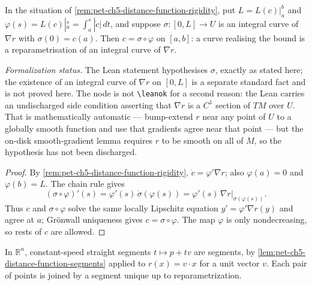 \begin{remark}
  \label{rem:pet-ch5-minimizer-is-reparametrized-integral-curve}
  In the situation of \cref{rem:pet-ch5-distance-function-rigidity}, put
  $L=L(c)|_a^b$ and $\varphi(s)=L(c)|_a^s=\int_a^s|\dot c|\,dt$, and suppose
  $\sigma:[0,L]\to U$ is an integral curve of $\nabla r$ with $\sigma(0)=c(a)$.
  Then $c=\sigma\circ\varphi$ on $[a,b]$: a curve realising the bound is a
  reparametrisation of an integral curve of $\nabla r$.

  \emph{Formalization status.} The Lean statement hypothesises $\sigma$, exactly
  as stated here; the existence of an integral curve of $\nabla r$ on $[0,L]$ is a
  separate standard fact and is not proved here. The node is not
  \texttt{\textbackslash leanok} for a second reason: the Lean carries an
  undischarged side condition asserting that $\nabla r$ is a $C^1$ section of $TM$
  over $U$. That is mathematically automatic — bump-extend $r$ near any point of
  $U$ to a globally smooth function and use that gradients agree near that point —
  but the on-disk smooth-gradient lemma requires $r$ to be smooth on all of $M$,
  so the hypothesis has not been discharged.
\end{remark}
\begin{proof}
  \sketch
  By \cref{rem:pet-ch5-distance-function-rigidity}, $\dot c=\varphi'\nabla r$;
  also $\varphi(a)=0$ and $\varphi(b)=L$.  The chain rule gives
  \[
    (\sigma\circ\varphi)'(s)=\varphi'(s)\,\dot\sigma(\varphi(s))
      =\varphi'(s)\,\nabla r|_{\sigma(\varphi(s))}.
  \]
  Thus $c$ and $\sigma\circ\varphi$ solve the same locally Lipschitz equation
  $y'=\varphi'\nabla r(y)$ and agree at $a$; Grönwall uniqueness gives
  $c=\sigma\circ\varphi$.  The map $\varphi$ is only nondecreasing, so rests of
  $c$ are allowed.
\end{proof}

\begin{example}
  \label{ex:pet-ch5-euclidean-segments}
  \leanok
  In $\mathbb R^n$, constant-speed straight segments $t\mapsto p+tv$ are segments, by
  \cref{lem:pet-ch5-distance-function-segments} applied to $r(x)=v\cdot x$ for a unit
  vector $v$. Each pair of points is joined by a segment unique up to
  reparametrization.
\end{example}

